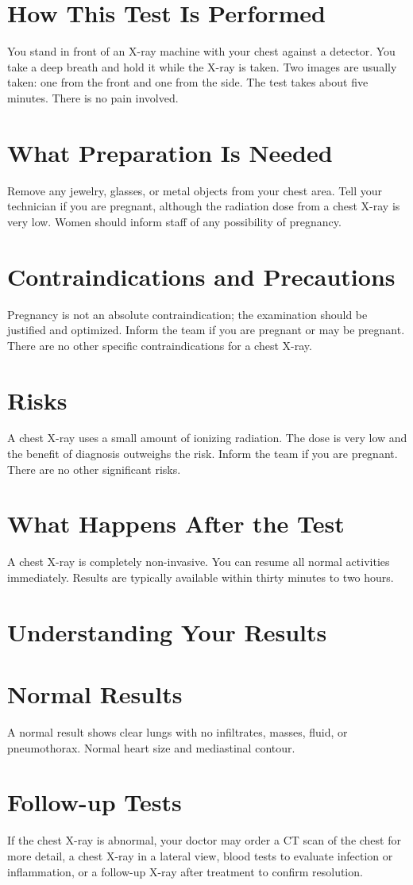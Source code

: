 \section*{How This Test Is Performed}
You stand in front of an X-ray machine with your chest against a detector. You take a deep breath and hold it while the X-ray is taken. Two images are usually taken: one from the front and one from the side. The test takes about five minutes. There is no pain involved.

\section*{What Preparation Is Needed}
Remove any jewelry, glasses, or metal objects from your chest area. Tell your technician if you are pregnant, although the radiation dose from a chest X-ray is very low. Women should inform staff of any possibility of pregnancy.

\section*{Contraindications and Precautions}
Pregnancy is not an absolute contraindication; the examination should be justified and optimized. Inform the team if you are pregnant or may be pregnant. There are no other specific contraindications for a chest X-ray.

\section*{Risks}
A chest X-ray uses a small amount of ionizing radiation. The dose is very low and the benefit of diagnosis outweighs the risk. Inform the team if you are pregnant. There are no other significant risks.

\section*{What Happens After the Test}
A chest X-ray is completely non-invasive. You can resume all normal activities immediately. Results are typically available within thirty minutes to two hours.

\section*{Understanding Your Results}

\section*{Normal Results}
A normal result shows clear lungs with no infiltrates, masses, fluid, or pneumothorax. Normal heart size and mediastinal contour.
\section*{Follow-up Tests}
If the chest X-ray is abnormal, your doctor may order a CT scan of the chest for more detail, a chest X-ray in a lateral view, blood tests to evaluate infection or inflammation, or a follow-up X-ray after treatment to confirm resolution.
\clearpage
